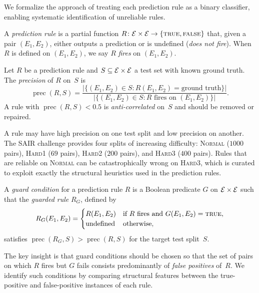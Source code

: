 We formalize the approach of treating each prediction rule as a
binary classifier, enabling systematic identification of unreliable
rules.

\begin{definition}\label{def:rule}
A \emph{prediction rule} is a partial function
$R \colon \mathcal{E} \times \mathcal{E} \to \{\textsc{true}, \textsc{false}\}$
that, given a pair $(E_1, E_2)$, either outputs a prediction
or is undefined (\emph{does not fire}).  When $R$ is defined
on $(E_1, E_2)$, we say $R$ \emph{fires} on $(E_1, E_2)$.
\end{definition}

\begin{definition}\label{def:precision}
Let $R$ be a prediction rule and $S \subseteq \mathcal{E} \times \mathcal{E}$
a test set with known ground truth.  The \emph{precision} of $R$
on~$S$ is
\[
  \operatorname{prec}(R, S) =
  \frac{|\{(E_1,E_2) \in S : R(E_1,E_2) = \text{ground truth}\}|}
       {|\{(E_1,E_2) \in S : R \text{ fires on } (E_1,E_2)\}|}.
\]
A rule with $\operatorname{prec}(R, S) < 0.5$ is
\emph{anti-correlated} on~$S$ and should be removed or repaired.
\end{definition}

\begin{remark}\label{rem:split-variance}
A rule may have high precision on one test split and low precision
on another.  The SAIR challenge provides four splits of increasing
difficulty: \textsc{Normal} ($1000$ pairs), \textsc{Hard1} ($69$ pairs),
\textsc{Hard2} ($200$ pairs), and \textsc{Hard3} ($400$ pairs).
Rules that are reliable on \textsc{Normal} can be catastrophically
wrong on \textsc{Hard3}, which is curated to exploit exactly the
structural heuristics used in the prediction rules.
\end{remark}

\begin{definition}\label{def:guard}
A \emph{guard condition} for a prediction rule $R$ is a Boolean
predicate $G$ on $\mathcal{E} \times \mathcal{E}$ such that the \emph{guarded rule}
$R_G$, defined by
\[
  R_G(E_1, E_2) =
  \begin{cases}
    R(E_1, E_2) & \text{if } R \text{ fires and } G(E_1, E_2) = \textsc{true}, \\
    \text{undefined} & \text{otherwise},
  \end{cases}
\]
satisfies $\operatorname{prec}(R_G, S) > \operatorname{prec}(R, S)$
for the target test split~$S$.
\end{definition}

The key insight is that guard conditions should be chosen so that
the set of pairs on which $R$ fires but $G$ fails consists
predominantly of \emph{false positives} of~$R$.  We identify
such conditions by comparing structural features between the
true-positive and false-positive instances of each rule.

